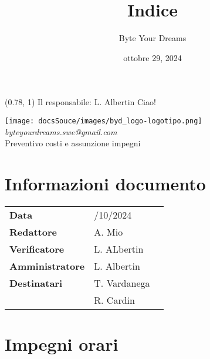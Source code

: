 \documentclass{article}
\title{\textbf{\fontsize{28}{6}\selectfont Indice}}
\author{\fontsize{14}{6}\selectfont Byte Your Dreams}
\date{ottobre 29, 2024}
\begin{document}
\begin{textblock*}{\textwidth}(0.78\textwidth, 1\textheight)
    Il responsabile: L. Albertin Ciao!
\end{textblock*}
\pagestyle{fancy}
\begin{center}
\vspace*{-2cm}
\texttt{[image: docsSouce/images/byd\_logo-logotipo.png]}
\fontsize{12}{6}\textcolor[RGB]{60, 60, 60}{\textit{byteyourdreams.swe@gmail.com}} \\
\vspace{0.5cm}
\fontsize{16}{6}\selectfont Preventivo costi e assunzione impegni \\
\vspace{0.5cm}
\end{center}

\section*{Informazioni documento}
\def\arraystretch{1.2}
\begin{tabular}{>{\raggedleft\arraybackslash}p{}|>{\raggedright\arraybackslash}p{}c}
\hline
\addlinespace
\textbf{Data} & 29/10/2024 \vspace{10pt} \\
\textbf{Redattore} & A. Mio \vspace{10pt} \\
\textbf{Verificatore} & L. ALbertin \vspace{10pt} \\
\textbf{Amministratore} & L. Albertin \vspace{10pt} \\
\textbf{Destinatari} & T. Vardanega \\ & R. Cardin \vspace{10pt}
\end{tabular}

\pagebreak 





\flushleft

\section{Impegni orari}
\end{document}
